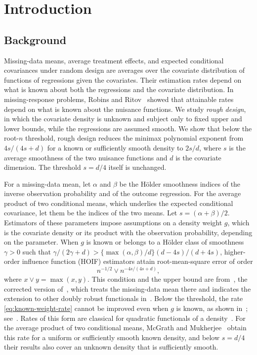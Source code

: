 \chapter{Introduction}\label{sec:intro}

\section{Background}\label{sec:intro-background}

Missing-data means, average treatment effects, and expected conditional
covariances under random design are averages over the covariate
distribution of functions of regressions given the covariates. Their
estimation rates depend on what is known about both the regressions and
the covariate distribution. In missing-response problems, Robins and
Ritov~\cite{robinsritov} showed that attainable rates depend on what is
known about the nuisance functions. We study \emph{rough
design}, in which the covariate density is unknown and subject only to
fixed upper and lower bounds, while the regressions are assumed smooth.
We show that below the root-$n$ threshold, rough design reduces the
minimax polynomial exponent from $4s/(4s+d)$ for a known or
sufficiently smooth density to $2s/d$, where $s$ is the average
smoothness of the two nuisance functions and $d$ is the covariate
dimension. The threshold $s=d/4$ itself is unchanged.

For a missing-data mean, let $\alpha$ and $\beta$ be the H\"older
smoothness indices of the inverse observation probability and of the
outcome regression. For the average product of two conditional means,
which underlies the expected conditional covariance, let them be the
indices of the two means. Let $s=(\alpha+\beta)/2$. Estimators of
these parameters impose assumptions on a density weight $g$, which is
the covariate density or its product with the observation probability,
depending on the parameter. When $g$ is known or belongs to a H\"older
class of smoothness $\gamma>0$ such that
$\gamma/(2\gamma+d)>\{\max(\alpha,\beta)/d\}(d-4s)/(d+4s)$,
higher-order influence function (HOIF) estimators attain
root-mean-square error of order
\begin{equation}\label{eq:known-weight-rate}
 n^{-1/2}\vee n^{-4s/(4s+d)},
\end{equation}
where $x\vee y=\max(x,y)$. This condition and the upper bound are
from~\cite[Section~3.1]{robins}, the corrected version
of~\cite{robins2017}, which treats the missing-data mean there and
indicates the extension to other doubly robust functionals
in~\cite[Section~11.3]{robins}. Below the threshold, the rate
\eqref{eq:known-weight-rate} cannot be improved even when $g$ is known,
as shown in~\cite{robins2009}; see~\cite[Section~3.1]{robins}. Rates of
this form are classical for quadratic functionals of a
density~\cite{bickelritov,birgemassart}. For the average product of two
conditional means, McGrath and
Mukherjee~\cite[Corollaries~1 and~16]{mcgrath} obtain this rate for a
uniform or sufficiently smooth known density, and below $s=d/4$ their
results also cover an unknown density that is sufficiently smooth.

